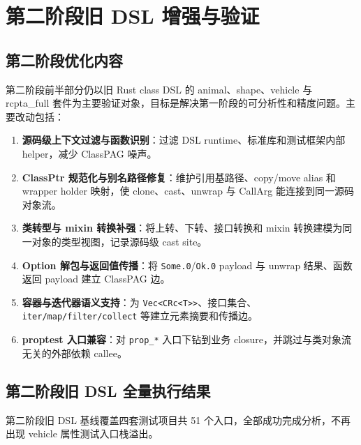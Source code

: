\documentclass[10.5pt,compsoc,UTF8]{cjc}
\theoremstyle{mystyle}
\begin{document}
\newpage
\doublespacing
\thispagestyle{empty}

{\raggedright
{}
\section{\heiti\centering 第二阶段旧 DSL 增强与验证}}

\subsection{第二阶段优化内容}

第二阶段前半部分仍以旧 Rust class DSL 的 animal、shape、vehicle 与 rcpta\_full 套件为主要验证对象，目标是解决第一阶段的可分析性和精度问题。主要改动包括：

\begin{enumerate}
    \item \textbf{源码级上下文过滤与函数识别}：过滤 DSL runtime、标准库和测试框架内部 helper，减少 ClassPAG 噪声。
    \item \textbf{ClassPtr 规范化与别名路径修复}：维护引用基路径、copy/move alias 和 wrapper holder 映射，使 clone、cast、unwrap 与 CallArg 能连接到同一源码对象流。
    \item \textbf{类转型与 mixin 转换补强}：将上转、下转、接口转换和 mixin 转换建模为同一对象的类型视图，记录源码级 cast site。
    \item \textbf{Option 解包与返回值传播}：将 \texttt{Some.0}/\texttt{Ok.0} payload 与 unwrap 结果、函数返回 payload 建立 ClassPAG 边。
    \item \textbf{容器与迭代器语义支持}：为 \texttt{Vec<CRc<T>>}、接口集合、\texttt{iter/map/filter/collect} 等建立元素摘要和传播边。
    \item \textbf{proptest 入口兼容}：对 \texttt{prop\_*} 入口下钻到业务 closure，并跳过与类对象流无关的外部依赖 callee。
\end{enumerate}

\subsection{第二阶段旧 DSL 全量执行结果}

第二阶段旧 DSL 基线覆盖四套测试项目共 51 个入口，全部成功完成分析，不再出现 vehicle 属性测试入口栈溢出。
\end{document}
